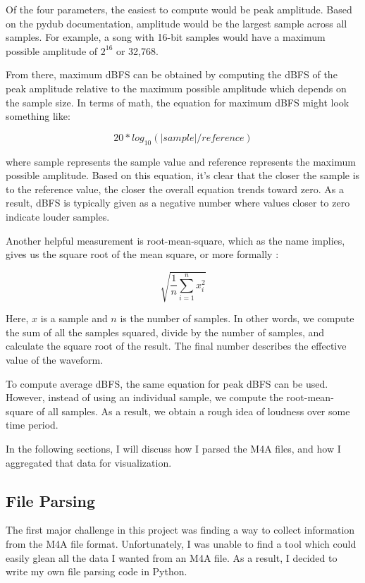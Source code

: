 \documentclass[journal]{vgtc}                %
\begin{document}
Of the four parameters, the easiest to compute would be peak amplitude. Based
on the pydub documentation, amplitude would be the largest sample across
all samples. For example, a song with 16-bit samples would have a maximum
possible amplitude of $2 ^ {16}$ or 32,768.

From there, maximum dBFS can be obtained by computing the dBFS of the peak
amplitude relative to the maximum possible amplitude which depends on the
sample size. In terms of math, the equation for maximum dBFS might look
something like:

\[ 20 * log_{10}( | sample | / reference ) \]

where sample represents the sample value and reference represents the maximum
possible amplitude. Based on this equation, it's clear that the closer the sample
is to the reference value, the closer the overall equation trends toward zero.
As a result, dBFS is typically given as a negative number where values closer
to zero indicate louder samples.

Another helpful measurement is root-mean-square, which as the name implies, gives
us the square root of the mean square, or more formally \cite{Weisstein:2011:RMS}:

\[ \sqrt{\frac{1}{n} \sum_{i=1}^{n} x_{i}^2} \]

Here, $x$ is a sample and $n$ is the number of samples. In other words, we
compute the sum of all the samples squared, divide by the number of samples,
and calculate the square root of the result. The final number describes the
effective value of the waveform.

To compute average dBFS, the same equation for peak dBFS can be used. However,
instead of using an individual sample, we compute the root-mean-square of all samples. As
a result, we obtain a rough idea of loudness over some time period.

In the following sections, I will discuss how I parsed the M4A files, and how
I aggregated that data for visualization.

\subsection{File Parsing}

The first major challenge in this project was finding a way to collect
information from the M4A file format. Unfortunately, I was unable to find a
tool which could easily glean all the data I wanted from an M4A file. As a result,
I decided to write my own file parsing code in Python.
\end{document}
